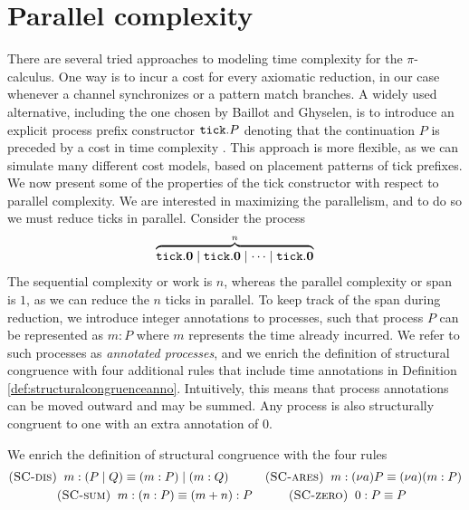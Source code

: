 \section{Parallel complexity}\label{sec:parcomplex}
There are several tried approaches to modeling time complexity for the $\pi$-calculus. One way is to incur a cost for every axiomatic reduction, in our case whenever a channel synchronizes or a pattern match branches. A widely used alternative, including the one chosen by Baillot and Ghyselen, is to introduce an explicit process prefix constructor $\texttt{tick}.P$ denoting that the continuation $P$ is preceded by a cost in time complexity \cite{BaillotGhyselen2021,BaillotEtAl2021,DasEtAl2018}. This approach is more flexible, as we can simulate many different cost models, based on placement patterns of tick prefixes. We now present some of the properties of the tick constructor with respect to parallel complexity. We are interested in maximizing the parallelism, and to do so we must reduce ticks in parallel. Consider the process
\begin{align*}
    \overbrace{\texttt{tick}.\mathbf{0} \mid \texttt{tick}.\mathbf{0} \mid \cdots \mid \texttt{tick}.\mathbf{0}}^{n}
\end{align*}
The sequential complexity or work is $n$, whereas the parallel complexity or span is $1$, as we can reduce the $n$ ticks in parallel. To keep track of the span during reduction, we introduce integer annotations to processes, such that process $P$ can be represented as $m : P$ where $m$ represents the time already incurred. We refer to such processes as \textit{annotated processes}, and we enrich the definition of structural congruence with four additional rules that include time annotations in Definition \ref{def:structuralcongruenceanno}. Intuitively, this means that process annotations can be moved outward and may be summed. Any process is also structurally congruent to one with an extra annotation of $0$.

\begin{defi}\label{def:structuralcongruenceanno}
    We enrich the definition of structural congruence with the four rules
    \begin{align*}
        &\mbox{\textsc{\protect{(SC-dis})}}\;\; m : (P \mid Q) \equiv (m : P) \mid (m : Q) \kern3em \mbox{\textsc{\protect{(SC-ares})}}\;\; m : (\nu a) P \equiv (\nu a) (m : P) \\
        &\kern4em\mbox{\textsc{\protect{(SC-sum})}}\;\; m : (n : P) \equiv (m + n) : P \kern3em \mbox{\textsc{\protect{(SC-zero})}}\;\; 0 : P \equiv P
    \end{align*}
\end{defi}

